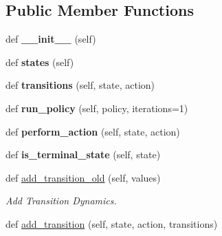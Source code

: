 \subsection*{Public Member Functions}
\begin{DoxyCompactItemize}
\item 
\mbox{\label{classsrc_1_1worlds_1_1abstract__world_1_1_abstract_world_a8bdd47c57f049a3e396ea64f4659db77}} 
def {\bfseries \+\_\+\+\_\+init\+\_\+\+\_\+} (self)
\item 
\mbox{\label{classsrc_1_1worlds_1_1abstract__world_1_1_abstract_world_a9da9b2c6a2403e83b08ba43d53a43d7d}} 
def {\bfseries states} (self)
\item 
\mbox{\label{classsrc_1_1worlds_1_1abstract__world_1_1_abstract_world_adbb238f1675445eab7c0b002f9860aec}} 
def {\bfseries transitions} (self, state, action)
\item 
\mbox{\label{classsrc_1_1worlds_1_1abstract__world_1_1_abstract_world_a79b8c2b7f122d0d2463736248417dcec}} 
def {\bfseries run\+\_\+policy} (self, policy, iterations=1)
\item 
\mbox{\label{classsrc_1_1worlds_1_1abstract__world_1_1_abstract_world_a3ef3e0539760634d7edfb132ee994cbb}} 
def {\bfseries perform\+\_\+action} (self, state, action)
\item 
\mbox{\label{classsrc_1_1worlds_1_1abstract__world_1_1_abstract_world_ae23093349cce428a7b0b924714d6e404}} 
def {\bfseries is\+\_\+terminal\+\_\+state} (self, state)
\item 
def \hyperlink{classsrc_1_1worlds_1_1abstract__world_1_1_abstract_world_a299f2aea5e9f19d70b84dc744621f41e}{add\+\_\+transition\+\_\+old} (self, values)
\begin{DoxyCompactList}\small\item\em Add Transition Dynamics. \end{DoxyCompactList}\item 
def \hyperlink{classsrc_1_1worlds_1_1abstract__world_1_1_abstract_world_add68c02b3b8a3f0c011c0a63f40febb3}{add\+\_\+transition} (self, state, action, transitions)

\end{DoxyCompactItemize}
